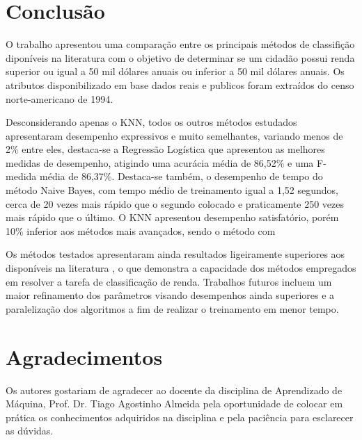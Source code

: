 \section{Conclusão}

O trabalho apresentou uma comparação entre os principais métodos de classifição diponíveis na literatura com o objetivo de determinar se um cidadão possui renda superior ou igual a 50 mil dólares anuais ou inferior a 50 mil dólares anuais. Os atributos disponibilizado em base dados reais e publicos foram extraídos do censo norte-americano de 1994.

Desconsiderando apenas o KNN, todos os outros métodos estudados apresentaram desempenho expressivos e muito semelhantes, variando menos de 2\% entre eles, destaca-se a Regressão Logística que apresentou as melhores medidas de desempenho, atigindo uma acurácia média de 86,52\% e uma F-medida média de 86,37\%. Destaca-se também, o desempenho de tempo do método Naive Bayes, com tempo médio de treinamento igual a 1,52 segundos, cerca de 20 vezes mais rápido que o segundo colocado e praticamente 250 vezes mais rápido que o último. O KNN apresentou desempenho satisfatório, porém 10\% inferior aos métodos mais avançados, sendo o método com 

Os métodos testados apresentaram ainda resultados ligeiramente superiores aos disponíveis na literatura \cite{base2}, o que demonstra a capacidade dos métodos empregados em resolver a tarefa de classificação de renda. Trabalhos futuros incluem um maior refinamento dos parâmetros visando desempenhos ainda superiores e a paralelização dos algoritmos a fim de realizar o treinamento em menor tempo.




\section*{Agradecimentos}
Os autores gostariam de agradecer ao docente da disciplina de Aprendizado de Máquina, Prof. Dr. Tiago Agostinho Almeida pela oportunidade de colocar em prática os conhecimentos adquiridos na disciplina e pela paciência para esclarecer as dúvidas.